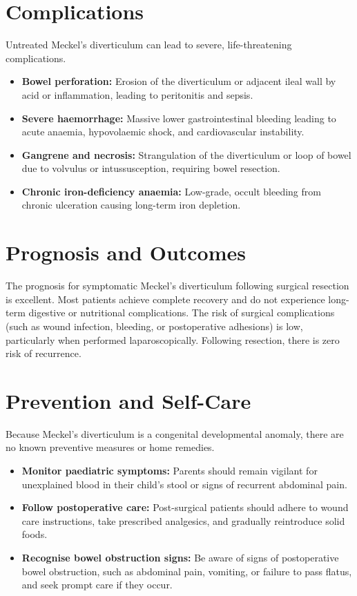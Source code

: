\section*{Complications}
Untreated Meckel's diverticulum can lead to severe, life-threatening complications.
\begin{itemize}
    \item \textbf{Bowel perforation:} Erosion of the diverticulum or adjacent ileal wall by acid or inflammation, leading to peritonitis and sepsis.
    \item \textbf{Severe haemorrhage:} Massive lower gastrointestinal bleeding leading to acute anaemia, hypovolaemic shock, and cardiovascular instability.
    \item \textbf{Gangrene and necrosis:} Strangulation of the diverticulum or loop of bowel due to volvulus or intussusception, requiring bowel resection.
    \item \textbf{Chronic iron-deficiency anaemia:} Low-grade, occult bleeding from chronic ulceration causing long-term iron depletion.
\end{itemize}

\section*{Prognosis and Outcomes}
The prognosis for symptomatic Meckel's diverticulum following surgical resection is excellent. Most patients achieve complete recovery and do not experience long-term digestive or nutritional complications. The risk of surgical complications (such as wound infection, bleeding, or postoperative adhesions) is low, particularly when performed laparoscopically. Following resection, there is zero risk of recurrence.

\section*{Prevention and Self-Care}
Because Meckel's diverticulum is a congenital developmental anomaly, there are no known preventive measures or home remedies.
\begin{itemize}
    \item \textbf{Monitor paediatric symptoms:} Parents should remain vigilant for unexplained blood in their child's stool or signs of recurrent abdominal pain.
    \item \textbf{Follow postoperative care:} Post-surgical patients should adhere to wound care instructions, take prescribed analgesics, and gradually reintroduce solid foods.
    \item \textbf{Recognise bowel obstruction signs:} Be aware of signs of postoperative bowel obstruction, such as abdominal pain, vomiting, or failure to pass flatus, and seek prompt care if they occur.
\end{itemize}

